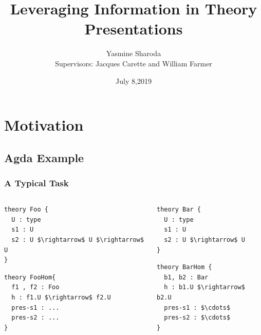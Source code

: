 \documentclass[t,12pt,numbers,fleqn,usenames,xcolor=dvipsnames]{beamer}
\title{Leveraging Information in Theory Presentations}
\author{Yasmine Sharoda\\ \vspace{0.5cm} Supervisors: Jacques Carette and William Farmer}
\institute[]{Department of Computing and Software, McMaster University}
\date{July 8,2019}
\begin{document}
\begin{frame}
\titlepage
\end{frame}

\section{Motivation}
\begin{frame}[fragile]

\end{frame}

\subsection{Agda Example}
\begin{frame}[fragile]
\frametitle{A Typical Task}
\begin{columns}
	\begin{column}{0.45\textwidth}
		\begin{lstlisting}
theory Foo { 
  U : type 
  s1 : U 
  s2 : U $\rightarrow$ U $\rightarrow$ U
}
		\end{lstlisting}
		\begin{lstlisting}
theory FooHom{
  f1 , f2 : Foo 
  h : f1.U $\rightarrow$ f2.U 
  pres-s1 : ... 
  pres-s2 : ... 
}
		\end{lstlisting}
	\end{column}
	\begin{column}{0.45\textwidth}
	 	\begin{lstlisting}
theory Bar {
  U : type 
  s1 : U 
  s2 : U $\rightarrow$ U 
}
	 	\end{lstlisting}
\pause
		\begin{lstlisting}
theory BarHom { 
  b1, b2 : Bar 
  h : b1.U $\rightarrow$ b2.U 
  pres-s1 : $\cdots$
  pres-s2 : $\cdots$
}
		\end{lstlisting}
	\end{column}
\end{columns}
\end{frame}
\end{document}
